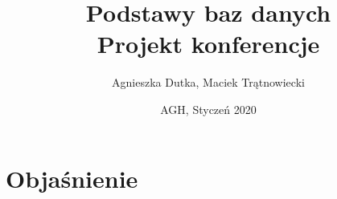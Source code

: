 \documentclass{article}
\title{Podstawy baz danych\\ Projekt konferencje}
\author{Agnieszka Dutka, Maciek Trątnowiecki}
\date{AGH, Styczeń 2020}
\begin{document}
\maketitle
\section{Objaśnienie}
\end{document}
